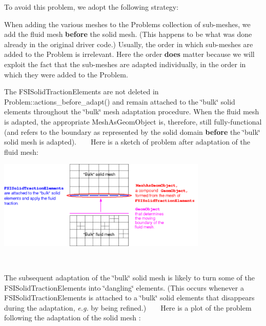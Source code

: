 To avoid this problem, we adopt the following strategy\+:
\begin{DoxyEnumerate}
\item When adding the various meshes to the {\ttfamily Problem\textquotesingle{}s} collection of sub-\/meshes, we add the fluid mesh {\bfseries before} the solid mesh. (This happens to be what was done already in the original driver code.) Usually, the order in which sub-\/meshes are added to the {\ttfamily Problem} is irrelevant. Here the order {\bfseries does} matter because we will exploit the fact that the sub-\/meshes are adapted individually, in the order in which they were added to the {\ttfamily Problem}. ~\newline
~\newline

\item The {\ttfamily F\+S\+I\+Solid\+Traction\+Elements} are not deleted in {\ttfamily Problem\+::actions\+\_\+before\+\_\+adapt()} and remain attached to the \char`\"{}bulk\char`\"{} solid elements throughout the \char`\"{}bulk\char`\"{} mesh adaptation procedure. When the fluid mesh is adapted, the appropriate {\ttfamily Mesh\+As\+Geom\+Object} is, therefore, still fully-\/functional (and refers to the boundary as represented by the solid domain {\bfseries before} the \char`\"{}bulk\char`\"{} solid mesh is adapted). ~\newline
~\newline
 Here is a sketch of problem after adaptation of the fluid mesh\+: ~\newline
~\newline
 
\begin{DoxyImage}
\includegraphics[width=0.75\textwidth]{fsi_with_adaptive_wall_adapted_fluid}
\end{DoxyImage}
 ~\newline
~\newline

\item The subsequent adaptation of the \char`\"{}bulk\char`\"{} solid mesh is likely to turn some of the {\ttfamily F\+S\+I\+Solid\+Traction\+Elements} into \char`\"{}dangling\char`\"{} elements. (This occurs whenever a {\ttfamily F\+S\+I\+Solid\+Traction\+Elements} is attached to a \char`\"{}bulk\char`\"{} solid elements that disappears during the adaptation, {\itshape  e.\+g. } by being refined.) ~\newline
~\newline
 Here is a plot of the problem following the adaptation of the solid mesh \+: ~\newline
~\newline
 

\end{DoxyEnumerate}
